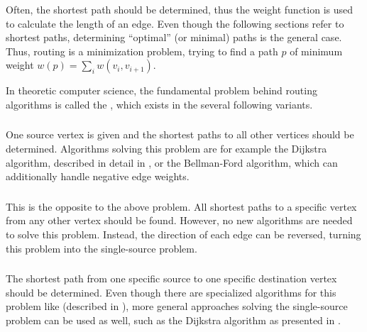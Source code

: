 		Often, the shortest path should be determined, thus the weight function is used to calculate the length of an edge.
		Even though the following sections refer to shortest paths, determining \enquote{optimal} (or minimal) paths is the general case.
		Thus, routing is a minimization problem, trying to find a path $p$ of minimum weight $w(p) = \sum_i{w(v_i, v_{i+1})}$.
		
		In theoretic computer science, the fundamental problem behind routing algorithms is called the , which exists in the several following variants.
		
		\subsubsection{}
		\label{subsubsec:single-source-shortest-path}
		
			One source vertex is given and the shortest paths to all other vertices should be determined.
			Algorithms solving this problem are for example the Dijkstra algorithm, described in detail in , or the Bellman-Ford algorithm, which can additionally handle negative edge weights\cite[651]{cormen-introduction-to-alg}.
		
		\subsubsection{}
		
			This is the opposite to the above problem.
			All shortest paths to a specific vertex from any other vertex should be found.
			However, no new algorithms are needed to solve this problem.
			Instead, the direction of each edge can be reversed, turning this problem into the single-source problem.
		
		\subsubsection{}
		
			The shortest path from one specific source to one specific destination vertex should be determined.
			Even though there are specialized algorithms for this problem like  (described in ), more general approaches solving the single-source problem can be used as well, such as the Dijkstra algorithm as presented in .
		
